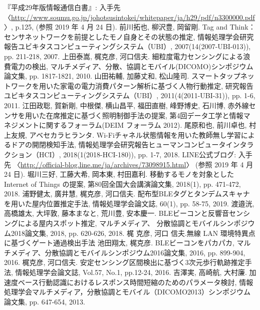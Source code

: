 \documentclass[Japanese]{dicomopapers}
\begin{document}



\begin{thebibliography}{20}
 『平成29年版情報通信白書』: 入手先 〈\url{http://www.soumu.go.jp/johotsusintokei/whitepaper/ja/h29/pdf/n3300000.pdf}〉, p.125, (参照 2019 年 4 月 24 日).
 前川拓也, 柳沢豊, 岡留剛. Tag and Think：センサネットワークを前提としたモノ自身とその状態の推定, 情報処理学会研究報告ユビキタスコンピューティングシステム（UBI）, 2007(14(2007-UBI-013)), pp. 211-218, 2007.
 上田泰嵩, 梶克彦, 河口信夫. 細粒度電力センシングによる浪費電力の検出, マルチメディア、分散、協調とモバイル(DICOMO)シンポジウム論文集, pp. 1817-1821, 2010.
 山田祐輔, 加藤丈和, 松山隆司. スマートタップネットワークを用いた家電の電力消費パターン解析に基づく人物行動推定, 研究報告ユビキタスコンピューティングシステム（UBI）, 2011(4(2011-UBI-31)), pp. 1-6, 2011.
 江田政聡, 賀新剛, 中根傑, 横山昌平, 福田直樹, 峰野博史, 石川博, 赤外線センサを用いた在席推定に基づく照明制御手法の提案, 第4回データ工学と情報マネジメントに関するフォーラム(DEIM フォーラム 2012).
 尾原和也, 前川卓也, 村上友規, アベセカラヒランタ. Wi-Fiチャネル状態情報を用いた教師無し学習によるドアの開閉検知手法, 情報処理学会研究報告ヒューマンコンピュータインタラクション（HCI）, 2018(1(2018-HCI-180)), pp. 1-7, 2018.
 LINE公式ブログ: 入手先 〈\url{http://official-blog.line.me/ja/archives/73098915.html}〉 (参照 2019 年 4 月 24 日).
 堀川三好, 工藤大希, 岡本東, 村田嘉利. 移動するモノを対象とした Internet of Things の提案, 第80回全国大会講演論文集, 2018(1), pp. 471-472, 2018.
 浦野健太, 廣井慧, 梶克彦, 河口信夫. 配布型BLEタグとタンデムスキャナを用いた屋内位置推定手法, 情報処理学会論文誌, 60(1), pp. 58-75, 2019.
 渡邉洸, 高橋雄太, 大坪敦, 藤本まなと, 荒川豊, 安本慶一. BLEビーコンと反響音センシングによる屋内スポット推定, マルチメディア、 分散協調とモバイルシンポジウム2018論文集, 2018, pp. 620-626, 2018.
 梶 克彦, 河口 信夫.無線 LAN 環境特異点に基づくゲート通過検出手法
 池田翔太, 梶克彦. BLEビーコンをパカパカ, マルチメディア、分散協調とモバイルシンポジウム2016論文集, 2016, pp. 899-904, 2016.
 梶克彦, 河口信夫. 安定センシング区間検出に基づく3次元歩行軌跡推定手法, 情報処理学会論文誌, Vol.57, No.1, pp.12-24, 2016.
 吉澤実, 高崎航, 大村廉. 加速度ベース行動認識におけるレスポンス時間短縮のためのパラメータ検討, 情報処理学会マルチメディア，分散協調とモバイル（DICOMO2013）シンポジウム論文集, pp. 647-654, 2013.

\end{thebibliography}
\end{document}
